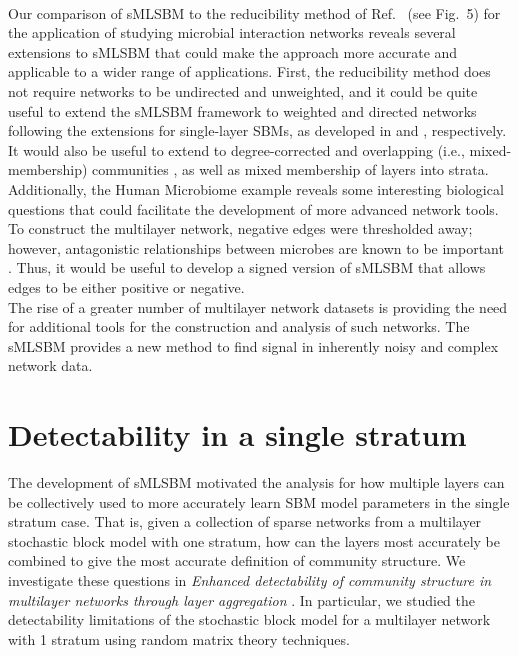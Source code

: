 %
\\\indent Our comparison of sMLSBM to the reducibility method of Ref.~\cite{domen} (see Fig.~5) for the application of studying microbial interaction networks reveals several extensions to sMLSBM that could make the approach more accurate and applicable to a wider range of applications. 
First, the reducibility method \cite{domen} does not require networks to be undirected and unweighted, and it could be quite useful to extend the sMLSBM framework to
weighted and directed networks following the extensions for single-layer SBMs, as developed in \cite{weightSBM} and \cite{sbmdirect}, respectively. 
It would also be useful to extend to degree-corrected and overlapping (i.e., mixed-membership) communities \cite{degreecorrectSBM}, as well as mixed membership of layers into strata.
%
%
Additionally, the Human Microbiome example reveals some interesting biological questions that could facilitate the development of more advanced network tools. To construct the multilayer network, negative edges were thresholded away; however, antagonistic relationships between microbes are known to be important \cite{antagonism}. Thus, it would be useful to develop a signed version of sMLSBM that allows edges to be either positive or negative. \\
\indent The rise of a greater number of multilayer network datasets is providing the need for additional tools for the construction and analysis of such networks. The sMLSBM provides a new method to find signal in inherently noisy and complex network data. 

\section{Detectability in a single stratum}
The development of sMLSBM motivated the analysis for how multiple layers can be collectively used to more accurately learn SBM model parameters in the single stratum case. That is, given a collection of sparse networks from a multilayer stochastic block model with one stratum, how can the layers most accurately be combined to give the most accurate definition of community structure. We investigate these questions in \emph{Enhanced detectability of community structure in multilayer networks through layer aggregation} \cite{taylor2015enhanced}. In particular, we studied the detectability limitations of the stochastic block model for a multilayer network with 1 stratum using random matrix theory techniques. 

